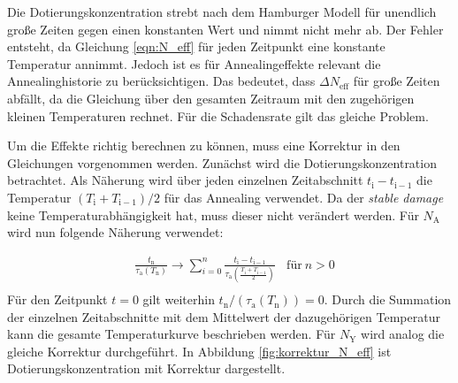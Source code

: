 
Die Dotierungskonzentration strebt nach dem Hamburger Modell
für unendlich große Zeiten gegen einen konstanten Wert und nimmt nicht mehr
ab.
Der Fehler entsteht, da Gleichung \ref{eqn:N_eff} für jeden
Zeitpunkt eine konstante Temperatur annimmt. Jedoch ist es für Annealingeffekte
relevant die Annealinghistorie zu berücksichtigen.
Das bedeutet, dass $\Delta N_{\mathrm{eff}}$ für große Zeiten abfällt, da die Gleichung über den
gesamten Zeitraum mit den zugehörigen kleinen Temperaturen rechnet. Für
die Schadensrate gilt das gleiche Problem.

Um die Effekte richtig berechnen zu können, muss eine Korrektur in den
Gleichungen vorgenommen werden.
Zunächst wird die Dotierungskonzentration betrachtet. Als Näherung wird über
jeden einzelnen Zeitabschnitt $t_{\mathrm{i}} - t_{\mathrm{i-1}}$ die
Temperatur $(T_{\mathrm{i}} +T_{\mathrm{i-1}})/2$ für das Annealing verwendet.
Da der \textit{stable damage} keine Temperaturabhängigkeit hat, muss dieser nicht
verändert werden. Für $N_{\mathrm{A}}$ wird nun folgende Näherung
verwendet:

\begin{align}
  &\frac{t_{\mathrm{n}}}{\tau_{\mathrm{a}}(T_{\mathrm{n}})} \rightarrow \sum_{i=0}^n  \frac{t_{\mathrm{i}} - t_{\mathrm{i-1}}}{\tau_{\mathrm{a}}(\frac{T_{\mathrm{i}} +T_{\mathrm{i-1}}}{2})} \:\:\:\: \text{für} \: n>0 \\
\end{align}
Für den Zeitpunkt $t=0$ gilt weiterhin $t_{\mathrm{n}}/(\tau_{\mathrm{a}}(T_{\mathrm{n}})) = 0$.
Durch die Summation der einzelnen Zeitabschnitte mit dem Mittelwert der dazugehörigen
Temperatur kann die gesamte Temperaturkurve beschrieben werden. Für $N_{\mathrm{Y}}$
wird analog die gleiche Korrektur durchgeführt.
In Abbildung \ref{fig:korrektur_N_eff} ist Dotierungskonzentration mit Korrektur dargestellt.


